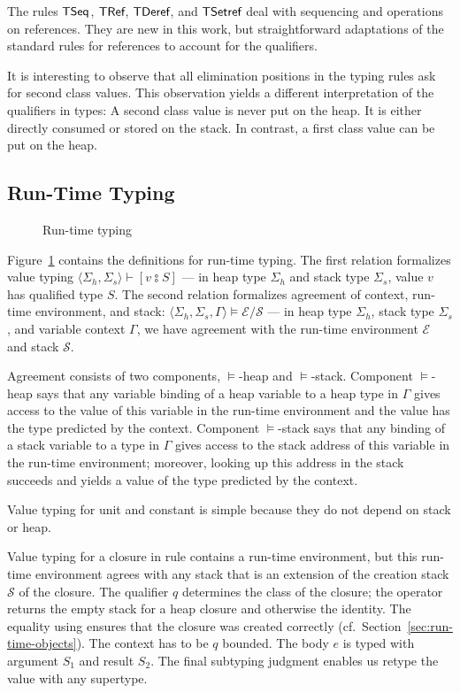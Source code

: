 \documentclass[sigplan,dvipsnames,screen]{acmart}
\begin{document}
The rules $\ACTSeq$, $\ACTRef$, $\ACTDeref$, and $\ACTSetref$ deal
with sequencing and operations on references. They are new in this
work, but straightforward adaptations of the standard rules for
references to account for the qualifiers.

It is interesting to observe that all elimination positions in the
typing rules ask for second class values. This observation yields a
different interpretation of the qualifiers in types: A second class
value is never put on the heap. It is either directly consumed or
stored on the stack. In contrast, a first class value can be put on
the heap.

\subsection{Run-Time Typing}
\label{sec:run-time-typing}
\begin{figure}[tp]
  \ValueTyping
  \caption{Run-time typing}
  \label{fig:run-time-typing}
\end{figure}

Figure~\ref{fig:run-time-typing} contains the definitions for run-time
typing. The first relation formalizes value typing $\langle \Sigma_h,
\Sigma_s \rangle\vdash{[ v \typecolon S]}$ --- in heap type $\Sigma_h$
and stack type $\Sigma_s$, value $v$ has qualified type $S$. The
second relation formalizes agreement of context, run-time environment,
and stack: $\langle \Sigma_h , \Sigma_s,
\Gamma\rangle\models\mathcal{E}/\mathcal{S}$ --- in heap type
$\Sigma_h$, stack type $\Sigma_s$, and variable context $\Gamma$, we
have agreement with the run-time environment $\mathcal{E}$ and stack
$\mathcal{S}$.

Agreement consists of two components, $\models$-heap and
$\models$-stack.
Component $\models$-heap says that any variable binding of a heap variable to a
heap type in $\Gamma$ gives access to the value of this variable in
the run-time environment and the value has the type predicted by the
context.
Component $\models$-stack says that any binding of a stack variable to a type in
$\Gamma$ gives access to the stack address of this variable in the
run-time environment; moreover, looking up this address in the stack
succeeds and yields a value of the type predicted by the context.

Value typing for unit and constant is simple because they do not
depend on stack or heap.

Value typing for a closure in rule {\ACTVClos} contains a run-time
environment, but this run-time environment agrees with any stack that
is an extension of the creation stack $\mathcal{S}$ of the
closure. The qualifier $q$ determines the class of the closure; the
 operator returns the empty stack for a heap closure
and otherwise the identity. The  equality using 
ensures that the closure was created correctly (cf.\ Section~\ref{sec:run-time-objects}).
The context has to be $q$ bounded.
The body $e$ is typed with argument $S_1$ and result $S_2$.
The final subtyping judgment enables us retype the value with any
supertype.
\end{document}
